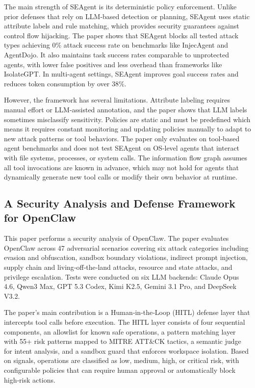\documentclass[a4paper]{report}
\begin{document}
The main strength of SEAgent is its deterministic policy enforcement. Unlike prior defenses that rely on LLM‑based detection or planning, SEAgent uses static attribute labels and rule matching, which provides security guarantees against control flow hijacking. The paper shows that SEAgent blocks all tested attack types achieving 0\% attack success rate on benchmarks like InjecAgent and AgentDojo. It also maintains task success rates comparable to unprotected agents, with lower false positives and less overhead than frameworks like IsolateGPT. In multi‑agent settings, SEAgent improves goal success rates and reduces token consumption by over 38\%.

However, the framework has several limitations. Attribute labeling requires manual effort or LLM‑assisted annotation, and the paper shows that LLM labels sometimes misclassify sensitivity. Policies are static and must be predefined which means it requires constant monitoring and updating policies manually to adapt to new attack patterns or tool behaviors. The paper only evaluates on tool‑based agent benchmarks and does not test SEAgent on OS‑level agents that interact with file systems, processes, or system calls. The information flow graph assumes all tool invocations are known in advance, which may not hold for agents that dynamically generate new tool calls or modify their own behavior at runtime.

\subsection{A Security Analysis and Defense Framework for OpenClaw}
This paper \cite{shan2025dont} performs a security analysis of OpenClaw. The paper evaluates OpenClaw across 47 adversarial scenarios covering six attack categories including evasion and obfuscation, sandbox boundary violations, indirect prompt injection, supply chain and living‑off‑the‑land attacks, resource and state attacks, and privilege escalation. Tests were conducted on six LLM backends: Claude Opus 4.6, Qwen3 Max, GPT 5.3 Codex, Kimi K2.5, Gemini 3.1 Pro, and DeepSeek V3.2.

The paper's main contribution is a Human‑in‑the‑Loop (HITL) defense layer that intercepts tool calls before execution. The HITL layer consists of four sequential components, an allowlist for known safe operations, a pattern matching layer with 55+ risk patterns mapped to MITRE ATT\&CK tactics, a semantic judge for intent analysis, and a sandbox guard that enforces workspace isolation. Based on signals, operations are classified as low, medium, high, or critical risk, with configurable policies that can require human approval or automatically block high‑risk actions.
\end{document}
